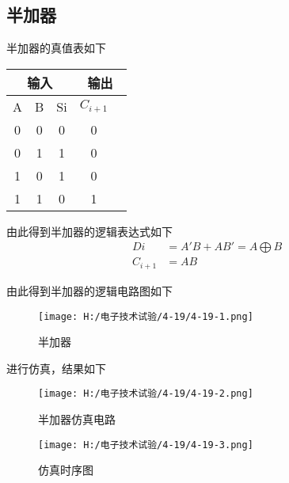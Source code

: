 \documentclass{article}
\begin{document}
\subsection{半加器}
半加器的真值表如下
\begin{table}[h]
 \centering  
 \begin{tabular}{c|c|c|c|c}
     \hline
     \multicolumn{3}{c}{输入} \vline  &  \multicolumn{2}{c}{输出} \vline     \\ \hline
           A             & B     &  Si               & $ C_{i+1} $  \\ \hline
           0             & 0     &   0               & 0            \\ \hline
           0             & 1     &   1               & 0            \\ \hline
           1             & 0     &   1               & 0            \\ \hline
           1             & 1     &   0               & 1            \\ \hline
          \end{tabular}
\end{table}
\par
由此得到半加器的逻辑表达式如下
\begin{align*}
\ Di&=A'B+AB'=A\bigoplus B\\
\ C_{i+1}&=AB
\end{align*}
\par
由此得到半加器的逻辑电路图如下
\begin{figure}[h]
\centering
\texttt{[image: H:/电子技术试验/4-19/4-19-1.png]}
\caption{半加器} \label{fig:aa}
\end{figure}

\newpage
进行仿真，结果如下

\begin{figure}[h]
  \centering
  \texttt{[image: H:/电子技术试验/4-19/4-19-2.png]}
  \caption{半加器仿真电路} \label{fig:aa}
  \end{figure}
  \begin{figure}[h]
    \centering
    \texttt{[image: H:/电子技术试验/4-19/4-19-3.png]}
    \caption{仿真时序图} \label{fig:aa}
    \end{figure}

    \newpage
\end{document}
